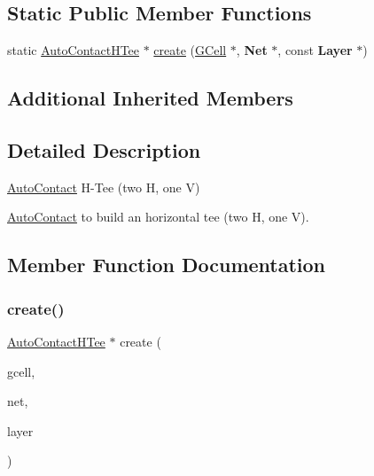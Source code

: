 \subsection*{Static Public Member Functions}
\begin{DoxyCompactItemize}
\item 
static \hyperlink{classKatabatic_1_1AutoContactHTee}{Auto\+Contact\+H\+Tee} $\ast$ \hyperlink{classKatabatic_1_1AutoContactHTee_a9b42579ac2487765c83e31f7ca3ee562}{create} (\hyperlink{classKatabatic_1_1GCell}{G\+Cell} $\ast$, \textbf{ Net} $\ast$, const \textbf{ Layer} $\ast$)
\end{DoxyCompactItemize}
\subsection*{Additional Inherited Members}


\subsection{Detailed Description}
\hyperlink{classKatabatic_1_1AutoContact}{Auto\+Contact} H-\/\+Tee (two H, one V) 

\hyperlink{classKatabatic_1_1AutoContact}{Auto\+Contact} to build an horizontal tee (two H, one V). 

\subsection{Member Function Documentation}
\mbox{\label{classKatabatic_1_1AutoContactHTee_a9b42579ac2487765c83e31f7ca3ee562}} 
\subsubsection{\texorpdfstring{create()}{create()}}
{\footnotesize\ttfamily \hyperlink{classKatabatic_1_1AutoContactHTee}{Auto\+Contact\+H\+Tee} $\ast$ create (\begin{DoxyParamCaption}\item[{\hyperlink{classKatabatic_1_1GCell}{G\+Cell} $\ast$}]{gcell,  }\item[{\textbf{ Net} $\ast$}]{net,  }\item[{const \textbf{ Layer} $\ast$}]{layer }\end{DoxyParamCaption})\hspace{0.3cm}{\ttfamily [static]}}


